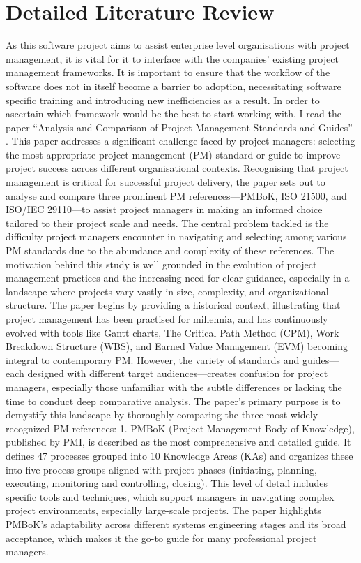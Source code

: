 \documentclass{report}
\begin{document}
\chapter{Detailed Literature Review}
As this software project aims to assist enterprise level organisations with project management, it is vital for it to interface with the companies’ existing project management frameworks. It is  important to ensure that the workflow of the software does not in itself become a barrier to adoption, necessitating software specific training and introducing new inefficiencies as a result. 
In order to ascertain which framework would be the best to start working with, I read the paper “Analysis and Comparison of Project Management Standards and Guides” \parencite{xueAnalysisComparisonProject}. This paper addresses a significant challenge faced by project managers: selecting the most appropriate project management (PM) standard or guide to improve project success across different organisational contexts. Recognising that project management is critical for successful project delivery, the paper sets out to analyse and compare three prominent PM references—PMBoK, ISO 21500, and ISO/IEC 29110—to assist project managers in making an informed choice tailored to their project scale and needs. The central problem tackled is the difficulty project managers encounter in navigating and selecting among various PM standards due to the abundance and complexity of these references.
The motivation behind this study is well grounded in the evolution of project management practices and the increasing need for clear guidance, especially in a landscape where projects vary vastly in size, complexity, and organizational structure. The paper begins by providing a historical context, illustrating that project management has been practised for millennia, and has continuously evolved with tools like Gantt charts, The Critical Path Method (CPM), Work Breakdown Structure (WBS), and Earned Value Management (EVM) becoming integral to contemporary PM. However, the variety of standards and guides—each designed with different target audiences—creates confusion for project managers, especially those unfamiliar with the subtle differences or lacking the time to conduct deep comparative analysis.
The paper’s primary purpose is to demystify this landscape by thoroughly comparing the three most widely recognized PM references:
    1. PMBoK (Project Management Body of Knowledge), published by PMI, is described as the most comprehensive and detailed guide. It defines 47 processes grouped into 10 Knowledge Areas (KAs) and organizes these into five process groups aligned with project phases (initiating, planning, executing, monitoring and controlling, closing). This level of detail includes specific tools and techniques, which support managers in navigating complex project environments, especially large-scale projects. The paper highlights PMBoK’s adaptability across different systems engineering stages and its broad acceptance, which makes it the go-to guide for many professional project managers.
\end{document}
